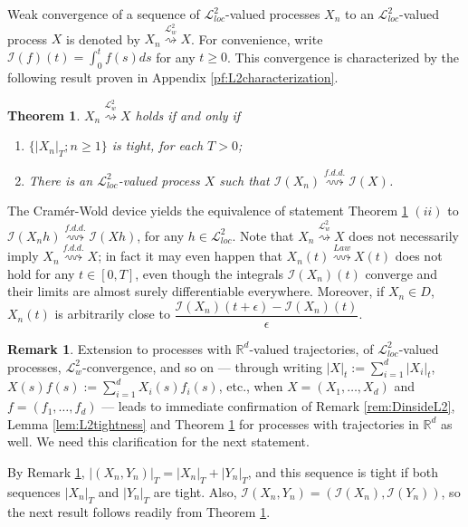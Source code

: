 \documentclass[final]{amsart}
\newtheorem{thm}{Theorem}[section]
\theoremstyle{definition}
\newtheorem{rem}{Remark}[section]
\numberwithin{equation}{section}
\newcommand{\dR}{\ensuremath{\mathbb{R}}}
\newcommand{\cI}{\ensuremath{\mathcal{I}}}
\newcommand{\cL}{\ensuremath{\mathcal{L}}}
\begin{document}
Weak convergence of a sequence of $\cL^2_{loc}$-valued processes $X_n$ to an $\cL^2_{loc}$-valued process $X$
is denoted by $X_n\stackrel{\cL^2_w}{\rightsquigarrow} X$. For convenience, write $\cI(f)(t) = \int_0^t f(s)ds $ for any $t\ge 0$.
This convergence is characterized by the following result proven in Appendix \ref{pf:L2characterization}.

\begin{thm}\label{thm:L2characterization}
$X_n\stackrel{\cL^2_w}{\rightsquigarrow} X$ holds if and only if
\begin{enumerate}
\item[(i)]
$\bigl\{|X_n|_T; n\ge1\bigr\}$ is tight, for each $T>0$;

\item[(ii)]
There is an $\cL^2_{loc}$-valued process $X$ such that $\cI(X_n)  \stackrel{f.d.d.}{\rightsquigarrow} \cI(X)$.

\end{enumerate}
\end{thm}

The Cram{\'e}r-Wold device yields the equivalence of statement Theorem \ref{thm:L2characterization} $(ii)$ to
$\cI(X_n h)  \stackrel{f.d.d.}{\rightsquigarrow} \cI(X h)$, for any $h\in\cL^2_{loc}$.
Note that $X_n\stackrel{\cL^2_w}{\rightsquigarrow} X$ does not necessarily imply $X_n \stackrel{f.d.d.}{\rightsquigarrow} X$;
in fact it may even happen that $X_n(t) \stackrel{Law}{\rightsquigarrow} X(t)$ does not hold for any $t\in[0,T]$, even though
the integrals $\cI(X_n)(t)$ converge and their limits are almost surely differentiable everywhere.
Moreover, if $X_n\in D$, $X_n(t)$ is arbitrarily close to $\dfrac{\cI(X_n)(t+\epsilon)-\cI(X_n)(t)}{\epsilon}$.

\begin{rem}\label{rem:RdExtension1}
Extension to processes with $\dR^d$-valued trajectories, of $\cL^2_{loc}$-valued processes, $\cL^2_w$-convergence, and so on ---
through writing $|X|_t:=\sum_{i=1}^d|X_i|_t$, $X(s)f(s):=\sum_{i=1}^d X_i(s)f_i(s)$, etc.,
when $X=(X_1,\ldots,X_d)$ and $f=(f_1,\ldots,f_d)$ --- leads to immediate confirmation of
Remark \ref{rem:DinsideL2}, Lemma \ref{lem:L2tightness} and Theorem \ref{thm:L2characterization}
for processes with trajectories in $\dR^d$ as well. We need this clarification for the next statement.
\end{rem}


By Remark \ref{rem:RdExtension1}, $|(X_n,Y_n)|_T=|X_n|_T+|Y_n|_T$, and this sequence is tight if both sequences $|X_n|_T$ and $|Y_n|_T$ are tight. Also,
$\cI(X_n,Y_n)= (\cI(X_n),\cI(Y_n) )$, so the next result follows readily from Theorem \ref{thm:L2characterization}.
\end{document}
